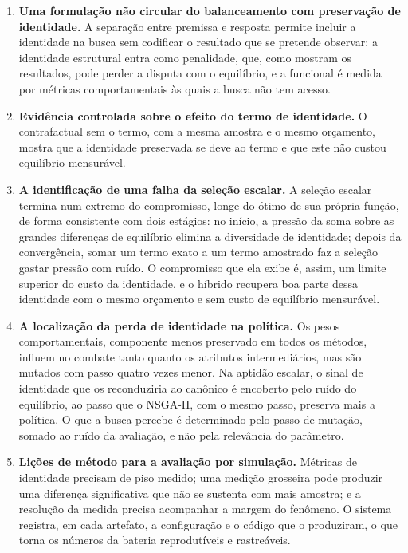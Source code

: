 \begin{enumerate}
    \item \textbf{Uma formulação não circular do balanceamento com preservação de identidade.} A separação entre premissa e resposta permite incluir a identidade na busca sem codificar o resultado que se pretende observar: a identidade estrutural entra como penalidade, que, como mostram os resultados, pode perder a disputa com o equilíbrio, e a funcional é medida por métricas comportamentais às quais a busca não tem acesso.
    \item \textbf{Evidência controlada sobre o efeito do termo de identidade.} O contrafactual sem o termo, com a mesma amostra e o mesmo orçamento, mostra que a identidade preservada se deve ao termo e que este não custou equilíbrio mensurável.
    \item \textbf{A identificação de uma falha da seleção escalar.} A seleção escalar termina num extremo do compromisso, longe do ótimo de sua própria função, de forma consistente com dois estágios: no início, a pressão da soma sobre as grandes diferenças de equilíbrio elimina a diversidade de identidade; depois da convergência, somar um termo exato a um termo amostrado faz a seleção gastar pressão com ruído. O compromisso que ela exibe é, assim, um limite superior do custo da identidade, e o híbrido recupera boa parte dessa identidade com o mesmo orçamento e sem custo de equilíbrio mensurável.
    \item \textbf{A localização da perda de identidade na política.} Os pesos comportamentais, componente menos preservado em todos os métodos, influem no combate tanto quanto os atributos intermediários, mas são mutados com passo quatro vezes menor. Na aptidão escalar, o sinal de identidade que os reconduziria ao canônico é encoberto pelo ruído do equilíbrio, ao passo que o NSGA-II, com o mesmo passo, preserva mais a política. O que a busca percebe é determinado pelo passo de mutação, somado ao ruído da avaliação, e não pela relevância do parâmetro.
    \item \textbf{Lições de método para a avaliação por simulação.} Métricas de identidade precisam de piso medido; uma medição grosseira pode produzir uma diferença significativa que não se sustenta com mais amostra; e a resolução da medida precisa acompanhar a margem do fenômeno. O sistema registra, em cada artefato, a configuração e o código que o produziram, o que torna os números da bateria reprodutíveis e rastreáveis.
\end{enumerate}

